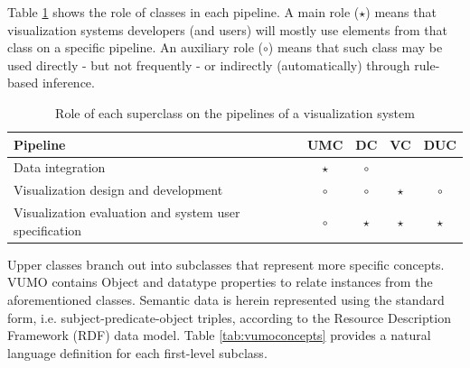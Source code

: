 \documentclass[]{interact}
\theoremstyle{plain}%
\theoremstyle{definition}
\theoremstyle{remark}
\theoremstyle{definition}
\begin{document}
Table \ref{tbl:vumoroles} shows the role of classes in each pipeline. A main role ($\star$) means that visualization systems developers (and users) will mostly use elements from that class on a specific pipeline. An auxiliary role ($\circ$) means that such class may be used directly - but not frequently - or indirectly (automatically) through rule-based inference.

\begin{small}
\begin{table}[htb]
\centering
\caption{Role of each superclass on the pipelines of a visualization system}
\label{tbl:vumoroles}
\begin{tabular}{lcccc}
\toprule
Pipeline & UMC & DC & VC & DUC \\ \midrule
Data integration & $\star$ & $\circ$ &  &  \\
Visualization design and development & $\circ$ & $\circ$ & $\star$ & $\circ$ \\
Visualization evaluation and system user specification & $\circ$ & $\star$ & $\star$ & $\star$ \\ \bottomrule
\end{tabular}
\end{table}
\end{small}




Upper classes branch out into subclasses that represent more specific concepts. VUMO contains Object and datatype properties to relate instances from the aforementioned classes. Semantic data is herein represented using the standard form, i.e. subject-predicate-object triples, according to the Resource Description Framework (RDF) data model. Table \ref{tab:vumoconcepts} provides a natural language definition for each first-level subclass.

\end{document}
